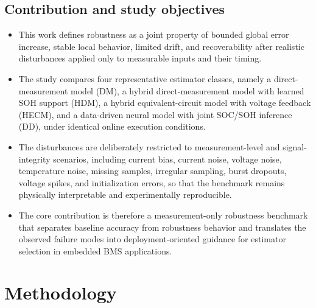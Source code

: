 \documentclass[review]{elsarticle}
\begin{document}
\subsection{Contribution and study objectives}
\begin{itemize}[leftmargin=*]
    \item This work defines robustness as a joint property of bounded global error increase, stable local behavior, limited drift, and recoverability after realistic disturbances applied only to measurable inputs and their timing.
    \item The study compares four representative estimator classes, namely a direct-measurement model (DM), a hybrid direct-measurement model with learned SOH support (HDM), a hybrid equivalent-circuit model with voltage feedback (HECM), and a data-driven neural model with joint SOC/SOH inference (DD), under identical online execution conditions.
    \item The disturbances are deliberately restricted to measurement-level and signal-integrity scenarios, including current bias, current noise, voltage noise, temperature noise, missing samples, irregular sampling, burst dropouts, voltage spikes, and initialization errors, so that the benchmark remains physically interpretable and experimentally reproducible.
    \item The core contribution is therefore a measurement-only robustness benchmark that separates baseline accuracy from robustness behavior and translates the observed failure modes into deployment-oriented guidance for estimator selection in embedded BMS applications.
\end{itemize}

\section{Methodology}
\end{document}
